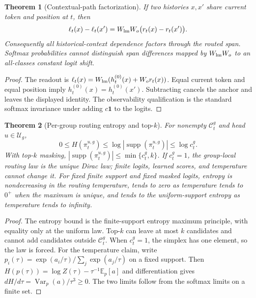 \documentclass{article}
\theoremstyle{plain}
\newtheorem{theorem}{Theorem}[section]
\theoremstyle{definition}
\theoremstyle{remark}
\begin{document}
\begin{theorem}[Contextual-path factorization]
\label{thm:contextual-path-factorization}
If two histories $x,x'$ share current token and position at $t$, then
\begin{equation}
\ell_t(x)-\ell_t(x')=W_{\rm lm}W_o\bigl(r_t(x)-r_t(x')\bigr).
\end{equation}
Consequently all historical-context dependence factors through the routed span.  Softmax probabilities cannot distinguish span differences mapped by $W_{\rm lm}W_o$ to an all-classes constant logit shift.
\end{theorem}

\begin{proof}
The readout is $\ell_t(x)=W_{\rm lm}(h_t^{(0)}(x)+W_o r_t(x))$.  Equal current token and equal position imply $h_t^{(0)}(x)=h_t^{(0)}(x')$.  Subtracting cancels the anchor and leaves the displayed identity.  The observability qualification is the standard softmax invariance under adding $c\mathbf 1$ to the logits.
\end{proof}

\begin{theorem}[Per-group routing entropy and top-$k$]
\label{thm:per-head-entropy}
For nonempty $\mathcal C_t^g$ and head $u\in\mathcal U_g$,
\begin{equation}
0\le H(\pi_t^{u,g})\le \log |\operatorname{supp}(\pi_t^{u,g})|\le \log c_t^g.
\end{equation}
With top-$k$ masking, $|\operatorname{supp}(\pi_t^{u,g})|\le \min\{c_t^g,k\}$.  If $c_t^g=1$, the group-local routing law is the unique Dirac law; finite logits, learned scores, and temperature cannot change it.  For fixed finite support and fixed masked logits, entropy is nondecreasing in the routing temperature, tends to zero as temperature tends to $0^+$ when the maximum is unique, and tends to the uniform-support entropy as temperature tends to infinity.
\end{theorem}

\begin{proof}
The entropy bound is the finite-support entropy maximum principle, with equality only at the uniform law.  Top-$k$ can leave at most $k$ candidates and cannot add candidates outside $\mathcal C_t^g$.  When $c_t^g=1$, the simplex has one element, so the law is forced.  For the temperature claim, write $p_i(\tau)=\exp(a_i/\tau)/\sum_j\exp(a_j/\tau)$ on a fixed support.  Then $H(p(\tau))=\log Z(\tau)-\tau^{-1}\mathbb E_p[a]$ and differentiation gives $dH/d\tau=\operatorname{Var}_p(a)/\tau^3\ge0$.  The two limits follow from the softmax limits on a finite set.
\end{proof}
\end{document}
